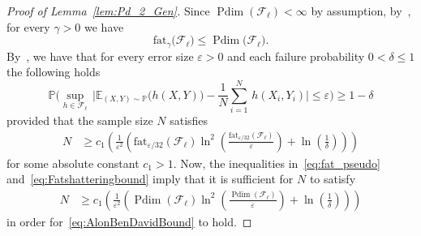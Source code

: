 \documentclass{article}
\theoremstyle{plain}
\theoremstyle{definition}
\theoremstyle{remark}
\newcommand{\fat}{\mathrm{fat}}
\theoremstyle{plain}
\numberwithin{thm}{section}
\theoremstyle{definition}
\numberwithin{equation}{section}
\begin{document}
\begin{proof}[{Proof of Lemma~\ref{lem:Pd_2_Gen}}]
Since $\operatorname{Pdim}(\mathcal{F}_{\ell})<\infty$ by assumption, 
by~\cite[Theorem 11.13 (i)]{AnthonyBartlett1999}, for every $\gamma>0$ we have
\begin{equation}
    \label{eq:fat_pseudo}
    \fat_{\gamma}\big(
    \mathcal{F}_{\ell}
    \big)
    \le
    \operatorname{Pdim}\big(\mathcal{F}_{\ell} \big)
    .
\end{equation}
By~\cite[Theorem 3.1]{AlonBenDavidCesaBianchiHaussler_PDGeneralization}, we have that
for every error size $\varepsilon>0$ and each failure probability $0<\delta \le 1$ the following holds
\begin{equation}
    \label{eq:AlonBenDavidBound}
    \mathbb{P}\Biggl(
    \sup_{h\in \mathcal{F}_{\ell}}
    \,
    \Big|
    \mathbb{E}_{(X,Y)\sim \mathbb{P}}\big(h(X,Y)\big)
    -
    \frac1{N}\sum_{i=1}^N\,h(X_i,Y_i)
    \Big|
    \le
    \varepsilon
    \Biggr)
    \ge
    1-\delta
\end{equation}
provided that the sample size $N$ satisfies
\begin{equation}
\label{eq:Fatshatteringbound}
\begin{aligned}
    N
&\ge
    c_1\left( \frac{1}{\varepsilon^2} \left(
        \fat_{\varepsilon/32}(\mathcal{F}_{\ell})
        \ln^2\left(\frac{
                \fat_{\varepsilon/32}(\mathcal{F}_{\ell})
            }{\varepsilon}\right) + \ln\left(\frac{1}{\delta}\right) \right) \right)
\end{aligned}
\end{equation}
for some absolute constant $c_1>1$.
Now, the inequalities in~\eqref{eq:fat_pseudo} and~\eqref{eq:Fatshatteringbound} imply that it is sufficient for $N$ to satisfy
\begin{equation}
\label{eq:PseudoDimensionSize}
\begin{aligned}
N
&\ge
c_1\left( \frac{1}{\varepsilon^2} \left(
\operatorname{Pdim}(\mathcal{F}_{\ell})
\ln^2\left(\frac{
\operatorname{Pdim}(\mathcal{F}_{\ell})
}{\varepsilon}\right) + \ln\left(\frac{1}{\delta}\right) \right) \right)
\end{aligned}
\end{equation}
in order for~\eqref{eq:AlonBenDavidBound} to hold.
\end{proof}
\end{document}
